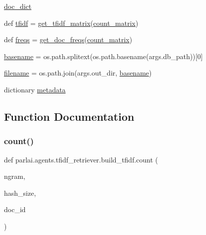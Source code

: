 \begin{DoxyCompactItemize}
\item 
\hyperlink{namespaceparlai_1_1agents_1_1tfidf__retriever_1_1build__tfidf_a09c3915a9ffe251347f232647caff959}{doc\+\_\+dict}
\item 
def \hyperlink{namespaceparlai_1_1agents_1_1tfidf__retriever_1_1build__tfidf_a60001be3ae4369767886e45fa5937e55}{tfidf} = \hyperlink{namespaceparlai_1_1agents_1_1tfidf__retriever_1_1build__tfidf_acce651a5b40c5a3b4009181f22c69eaa}{get\+\_\+tfidf\+\_\+matrix}(\hyperlink{namespaceparlai_1_1agents_1_1tfidf__retriever_1_1build__tfidf_afe20f2925824bab82a89672734347544}{count\+\_\+matrix})
\item 
def \hyperlink{namespaceparlai_1_1agents_1_1tfidf__retriever_1_1build__tfidf_abb3607652abdd76d57a6ae90e19e3828}{freqs} = \hyperlink{namespaceparlai_1_1agents_1_1tfidf__retriever_1_1build__tfidf_ac6883ed21006848661f6c748f91aff56}{get\+\_\+doc\+\_\+freqs}(\hyperlink{namespaceparlai_1_1agents_1_1tfidf__retriever_1_1build__tfidf_afe20f2925824bab82a89672734347544}{count\+\_\+matrix})
\item 
\hyperlink{namespaceparlai_1_1agents_1_1tfidf__retriever_1_1build__tfidf_a0a314a0288fcdf731f21e279e9f7b27a}{basename} = os.\+path.\+splitext(os.\+path.\+basename(args.\+db\+\_\+path))\mbox{[}0\mbox{]}
\item 
\hyperlink{namespaceparlai_1_1agents_1_1tfidf__retriever_1_1build__tfidf_afcbd4a0d6b9f9e9d88008c66912778cf}{filename} = os.\+path.\+join(args.\+out\+\_\+dir, \hyperlink{namespaceparlai_1_1agents_1_1tfidf__retriever_1_1build__tfidf_a0a314a0288fcdf731f21e279e9f7b27a}{basename})
\item 
dictionary \hyperlink{namespaceparlai_1_1agents_1_1tfidf__retriever_1_1build__tfidf_a78c951c63ece0474919ceef5d15d7e5d}{metadata}
\end{DoxyCompactItemize}


\subsection{Function Documentation}
\mbox{\label{namespaceparlai_1_1agents_1_1tfidf__retriever_1_1build__tfidf_a7fc352c82f4a875b23fec3b046027039}} 
\subsubsection{\texorpdfstring{count()}{count()}}
{\footnotesize\ttfamily def parlai.\+agents.\+tfidf\+\_\+retriever.\+build\+\_\+tfidf.\+count (\begin{DoxyParamCaption}\item[{}]{ngram,  }\item[{}]{hash\+\_\+size,  }\item[{}]{doc\+\_\+id }\end{DoxyParamCaption})}

